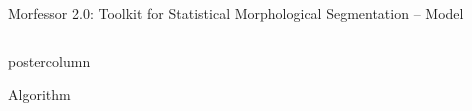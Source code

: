 \documentclass[final]{beamer} %
\DeclareMathOperator*{\argmin}{arg\,min}
\newcommand{\seq}[1]{\boldsymbol{#1}}
\newcommand{\params}{\boldsymbol{\theta}}
\newcommand{\data}{\seq{D}}
\newcommand{\hatdata}{\seq{\hat{D}}}
\newcommand{\token}{\phi}
\begin{document}
\begin{frame}{Morfessor 2.0: Toolkit for Statistical Morphological Segmentation -- Model}
\begin{columns}
\begin{column}{.3\textwidth}
\begin{beamercolorbox}[center,wd=\textwidth]{postercolumn}
\begin{block}{Algorithm}
            \end{block}
	\end{beamercolorbox}

\vfill







%
%            
%
%
%
%
%






\end{column}
\end{columns}
\end{frame}
\end{document}
